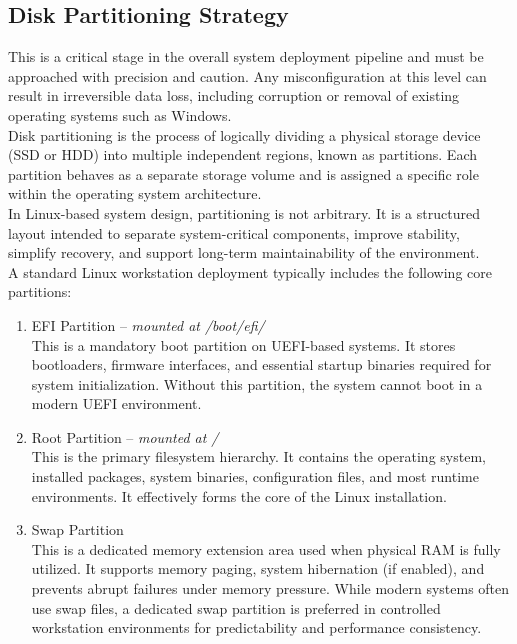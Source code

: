 \subsection{Disk Partitioning Strategy}
\label{subsec:disk}
This is a critical stage in the overall system deployment pipeline and must be approached with precision and caution. Any misconfiguration at this level can result in irreversible data loss, including corruption or removal of existing operating systems such as Windows. \\

Disk partitioning is the process of logically dividing a physical storage device (SSD or HDD) into multiple independent regions, known as partitions. Each partition behaves as a separate storage volume and is assigned a specific role within the operating system architecture. \\

In Linux-based system design, partitioning is not arbitrary. It is a structured layout intended to separate system-critical components, improve stability, simplify recovery, and support long-term maintainability of the environment. \\

A standard Linux workstation deployment typically includes the following core partitions:

\begin{enumerate}
	\item  EFI Partition -- \textit{mounted at /boot/efi/} \\
		This is a mandatory boot partition on UEFI-based systems. It stores bootloaders, firmware interfaces, and essential startup binaries required for system initialization. Without this partition, the system cannot boot in a modern UEFI environment.

	\item  Root Partition -- \textit{mounted at /} \\
		This is the primary filesystem hierarchy. It contains the operating system, installed packages, system binaries, configuration files, and most runtime environments. It effectively forms the core of the Linux installation.

	\item  Swap Partition \\
		This is a dedicated memory extension area used when physical RAM is fully utilized. It supports memory paging, system hibernation (if enabled), and prevents abrupt failures under memory pressure. While modern systems often use swap files, a dedicated swap partition is preferred in controlled workstation environments for predictability and performance consistency.

\end{enumerate}

